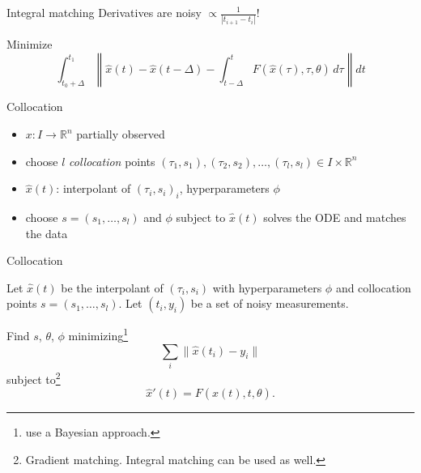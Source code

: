 \documentclass[14pt,aspectratio=169]{beamer}
\begin{document}
\begin{frame}{Integral matching}
Derivatives are noisy $ \propto \frac{1}{|t_{i+1} - t_i|}$!
    \begin{graphicbox}[boxrule=2pt]
        Minimize
        $$
        \displaystyle\int_{t_0 + \Delta}^{t_1} \left\|\hat x(t) -\hat x(t - \Delta) - \int_{t - \Delta} ^t F(\hat x(\tau), \tau, \theta)\, d\tau  \right\| dt 
        $$
    \end{graphicbox}
\end{frame}
\begin{frame}{Collocation}
    \begin{itemize}
        \item $x\colon I \to \mathbb{R}^n$ partially observed
        \item choose $l$ \emph{collocation} points $(\tau_1, s_1), (\tau_2, s_2), \dots, (\tau_l, s_l) \in I\times \mathbb{R}^n$  
        \item $\hat x(t)$: interpolant of $(\tau_i, s_i)_{i}$, {\color{gray} hyperparameters $\phi$}
        \item choose $s=(s_1, \dots, s_l)$ and $\phi$ subject to $\hat x(t)$ solves the ODE and matches the data 
    \end{itemize}
\end{frame}
\begin{frame}{Collocation}
%
     \begin{small}
        Let $\hat x(t)$ be the interpolant of $(\tau_i, s_i)$ with hyperparameters $\phi$ and collocation points $s=(s_1, \dots, s_l)$. Let $(t_i, y_i)$ be a set of noisy measurements.
     \end{small}
    \begin{graphicbox}
        \small
        Find $s$, $\theta$, $\phi$ minimizing\footnote{\textcite{magi} use a Bayesian approach.}
        $$
        \sum_i \|
         \hat x(t_i) - y_i
        \|
        $$
        subject to\footnote{Gradient matching. Integral matching can be used as well.} 
        $$
        \hat x'(t) = F(\hat x(t), t, \theta).
        $$
    \end{graphicbox}
\end{frame}
\end{document}
